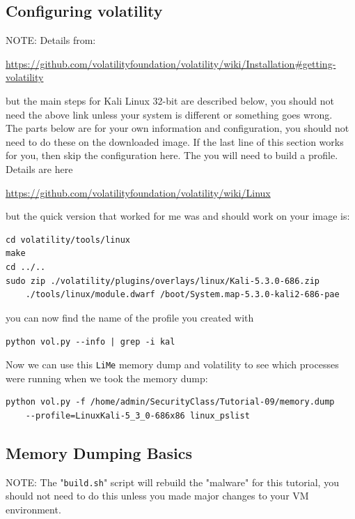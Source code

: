 \documentclass{article}
\begin{document}
\subsection{Configuring volatility}
NOTE: Details from:
\begin{center}
    \url{https://github.com/volatilityfoundation/volatility/wiki/Installation#getting-volatility}
\end{center}
\noindent but the main steps for Kali Linux 32-bit are described below, you should not
need the above link unless your system is different or something goes wrong.\\

\noindent The parts below are for your own information and configuration, you
should not need to do these on the downloaded image. If the last line of this
section works for you, then skip the configuration here.
The you will need to build a profile. Details are here
\begin{center}
    \url{https://github.com/volatilityfoundation/volatility/wiki/Linux}
\end{center}
\noindent but the quick version that worked for me was and should work on your image is:
\begin{lstlisting}
cd volatility/tools/linux
make
cd ../..
sudo zip ./volatility/plugins/overlays/linux/Kali-5.3.0-686.zip
    ./tools/linux/module.dwarf /boot/System.map-5.3.0-kali2-686-pae
\end{lstlisting}
\noindent you can now find the name of the profile you created with
\begin{center}
    \lstinline{python vol.py --info | grep -i kal}
\end{center}
\noindent Now we can use this \lstinline{LiMe} memory dump and volatility to see which
processes were running when we took the memory dump:
\begin{center}
    \begin{lstlisting}
python vol.py -f /home/admin/SecurityClass/Tutorial-09/memory.dump
    --profile=LinuxKali-5_3_0-686x86 linux_pslist
\end{lstlisting}
\end{center}
\subsection{Memory Dumping Basics}
NOTE: The "\lstinline{build.sh}" script will rebuild the "malware" for this tutorial,
you should not need to do this unless you made major changes to your VM
environment.\\
\end{document}
